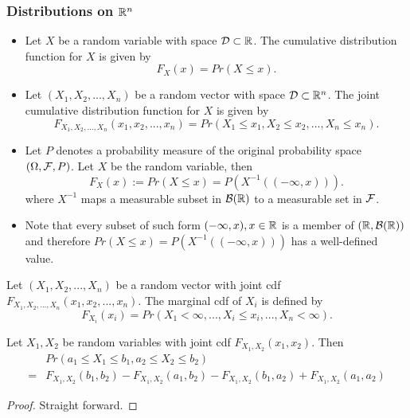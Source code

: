 \begin{refsection}
\subsubsection{Distributions on $\mathbb{R}^n$}
\begin{definition}\hfill
\begin{itemize}
	\item Let $X$ be a random variable with space $\mathcal{D}\subset \mathbb{R}$. The cumulative distribution function for $X$ is given by $$F_X(x) = Pr(X\leq x).$$
	\item Let $(X_1,X_2,...,X_n)$ be a random vector with space $\mathcal{D}\subset \mathbb{R}^n$. The joint cumulative distribution function for $X$ is given by $$F_{X_1,X_2,...,X_n}(x_1,x_2,...,x_n) = Pr(X_1\leq x_1,X_2\leq x_2,...,X_n\leq x_n).$$	
\end{itemize}	
\end{definition}



\begin{remark}\cite{fries2007mathematical} 
\begin{itemize}
	\item Let $P$ denotes a probability measure of the original probability space $(\Omega,\mathcal{F},P)$. Let $X$ be the random variable, then 
	$$F_X(x):=Pr( X\leq x) = P(X^{-1}((-\infty,x))).$$
	where $X^{-1}$ maps a measurable subset in $\mathcal{B}(\mathbb{R})$ to a measurable set in $\mathcal{F}$. 
	\item Note that every subset of such form $(-\infty,x),x\in\mathbb{R}$ is a member of $(\mathbb{R},\mathcal{B}(\mathbb{R}))$ and therefore $Pr( X\leq x) = P(X^{-1}((-\infty,x)))$ has a well-defined value.
\end{itemize}	
	
\end{remark}



\begin{definition}
	\item Let $(X_1,X_2,...,X_n)$ be a random vector with joint cdf $F_{X_1,X_2,...,X_n}(x_1,x_2,...,x_n)$. The marginal cdf of $X_i$ is defined by
	$$F_{X_i}(x_i) = Pr(X_1<\infty,...,X_i\leq x_i,...,X_n < \infty).$$
\end{definition}

\begin{lemma}\label{ch:theory-of-probability:th:area probability formulaBivariateRandomVector}\cite[76]{hoggintroduction}
Let $X_1,X_2$ be random variables with joint cdf $F_{X_1,X_2}(x_1,x_2)$. Then
\begin{align*}
& Pr(a_1\leq X_1\leq b_1, a_2\leq X_2\leq b_2) \\
=& F_{X_1,X_2}(b_1,b_2) -  F_{X_1,X_2}(a_1,b_2) - F_{X_1,X_2}(b_1,a_2)  +F_{X_1,X_2}(a_1,a_2) 
\end{align*}
\end{lemma}
\begin{proof}
Straight forward.
\end{proof}


\end{refsection}
